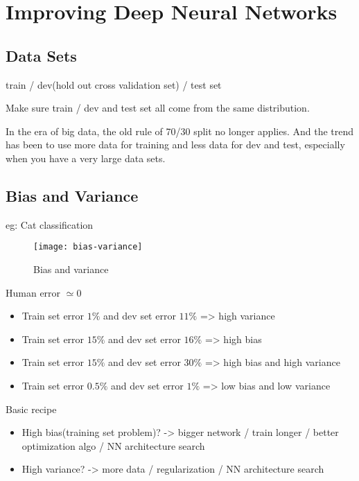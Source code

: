 \section{Improving Deep Neural Networks}

\subsection{Data Sets}
train / dev(hold out cross validation set) / test set

Make sure train / dev and test set all come from the same distribution.

In the era of big data, the old rule of 70/30 split no longer applies.
And the trend has been to use more data for training and less data for dev and test, especially when you have a very large data sets.

\subsection{Bias and Variance}
eg: Cat classification

\begin{figure}[htbp]
	\centering
	\texttt{[image: bias-variance]}\\
	\caption{Bias and variance}
	\label{fig.bias-variance}
\end{figure}

Human error $\simeq 0$
\begin{itemize}
\item Train set error $1\%$ and dev set error $11\%$ => high variance
\item Train set error $15\%$ and dev set error $16\%$ => high bias
\item Train set error $15\%$ and dev set error $30\%$ => high bias and high variance
\item Train set error $0.5\%$ and dev set error $1\%$ => low bias and low variance
\end{itemize}

Basic recipe
\begin{itemize}
\item High bias(training set problem)? -> bigger network / train longer / better optimization algo / NN architecture search
\item High variance? -> more data / regularization / NN architecture search
\end{itemize}

